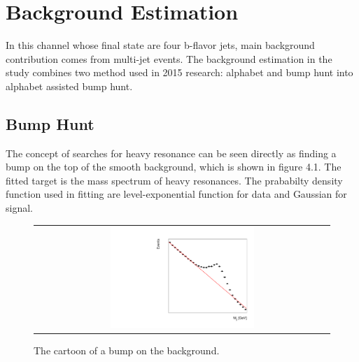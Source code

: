 
\chapter{Background Estimation} \label{Background}
In this channel whose final state are four b-flavor jets, main background contribution comes from multi-jet events.
The background estimation in the study combines two method used in 2015 research: alphabet and bump hunt into alphabet assisted bump hunt.
 

\section{Bump Hunt}
The concept of searches for heavy resonance can be seen directly as finding a bump on the top of the smooth background, which is shown in figure 4.1. The fitted target is the mass spectrum of heavy resonances. The prababilty density function used in fitting are level-exponential function for data and Gaussian for signal.
\begin{figure}[t]
  \centering
  \begin{tabular}{c}
    \includegraphics[width=0.5\textwidth]{Figures/cart.pdf} 
   
  \end{tabular}
  \caption{The cartoon of a bump on the background.}
  \label{fig:hvt_brs}
\end{figure}

